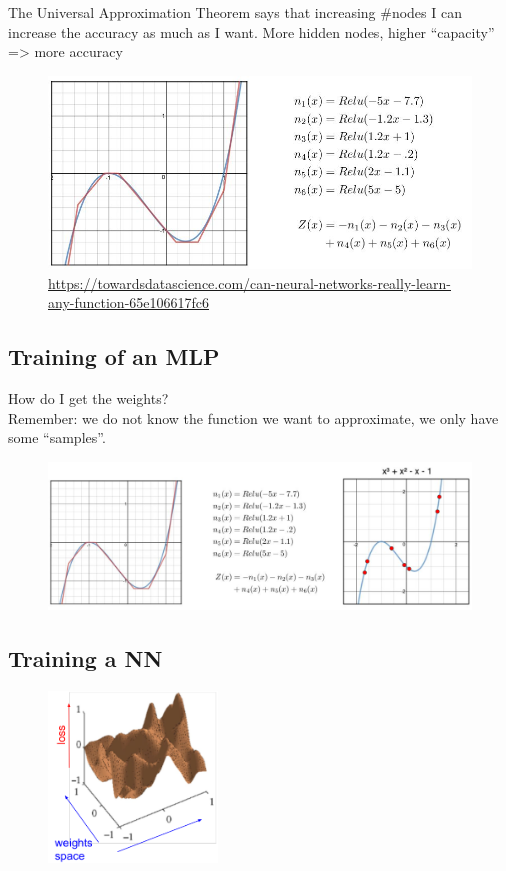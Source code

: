 The Universal Approximation Theorem says that increasing \#nodes I can
increase the accuracy as much as I want. More hidden nodes, higher “capacity” => more accuracy

\begin{figure}[ht]
	\centering
	\includegraphics[width=0.7\linewidth]{figure_ml/example1d2.png}
	\caption{\url{https://towardsdatascience.com/can-neural-networks-really-learn-any-function-65e106617fc6}}
\end{figure}
\FloatBarrier

\subsection{Training of an MLP}
How do I get the weights?\\
Remember: we do not know the function we want to approximate, we only have some “samples”.

\begin{figure}[ht]
	\centering
	\includegraphics[width=0.9\linewidth]{figure_ml/training_mlp.png}
\end{figure}
\FloatBarrier

\subsection{Training a NN}


\begin{figure}
	\includegraphics[width=0.4\textwidth]{figure_ml/training_nn.png}
\end{figure} 

